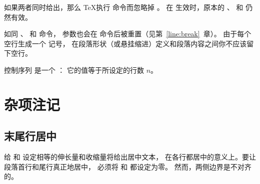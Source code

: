 \documentclass{book}
\begin{document}
如果两者同时给出，那么 \TeX 执行  命令而忽略掉 。
在  生效时，原本的 、 和
 仍然有效。

如同 、 和  命令，
参数也会在  命令后被重置（见第~\ref{line:break}~章）。
由于每个空行生成一个  记号，
在段落形状（或悬挂缩进）定义和段落内容之间你不应该留下空行。

控制序列
\alt
{} 是一个 ：
它的值等于所设定的行数 $n$。

\section{杂项注记}

\subsection{末尾行居中}

给  和  设定相等的伸长量和收缩量将给出居中文本，
在各行都居中的意义上。要让段落首行和尾行真正地居中，
必须将  和  都设定为零。
然而，两侧边界是不对齐的。
\end{document}
